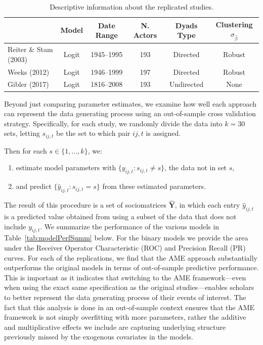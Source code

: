 \begin{table}
\caption{Descriptive information about the replicated studies. }
	\begin{tabular}{lccccc}
		& Model &  Date Range & N. Actors  & Dyads Type & Clustering $\sigma_{\hat{\beta}}$ \\ \toprule
		Reiter \& Stam (2003) &Logit &1945--1995 &  193 & Directed & Robust \\	
		Weeks (2012) & Logit & 1946--1999 &197 & Directed & Robust \\
		Gibler (2017) & Logit & 1816--2008 &193 & Undirected & None \\ \bottomrule
	\end{tabular}
	\label{tab:modelDesign}
\end{table}

Beyond just comparing parameter estimates, we examine how well each approach can represent the data generating process using an out-of-sample cross validation strategy. Specifically, for each study, we randomly divide the data into $k=30$ sets, letting $s_{ij,t}$ be the set to which pair $ij,t$ is assigned.

Then for each $s \in \{1,\ldots,k\}$, we:

\begin{enumerate}
	\item estimate model parameters with $\{y_{ij,t}: s_{ij,t} \neq s\}$, the data not in set $s$,
	\item and predict $\{\hat{y}_{ij,t}: s_{ij,t} = s\}$ from these estimated parameters. 
\end{enumerate}

The result of this procedure is a set of sociomatrices $\bm \hat Y$, in which each entry $\hat y_{ij,t}$ is a predicted value obtained from using a subset of the data that does not include $y_{ij,t}$. We summarize the performance of the various models in Table~\ref{tab:modelPerfSumm} below. For the binary models we provide the area under the Receiver Operator Characteristic (ROC) and Precision Recall (PR) curves. For each of the replications, we find that the AME approach substantially outperforms the original models in terms of out-of-sample predictive performance. This is important as it indicates that switching to the AME framework---even when using the exact same specification as the original studies---enables scholars to better represent the data generating process of their events of interest. The fact that this analysis is done in an out-of-sample context ensures that the AME framework is not simply overfitting with more parameters, rather the additive and multiplicative effects we include are capturing underlying structure previously missed by the exogenous covariates in the models.

